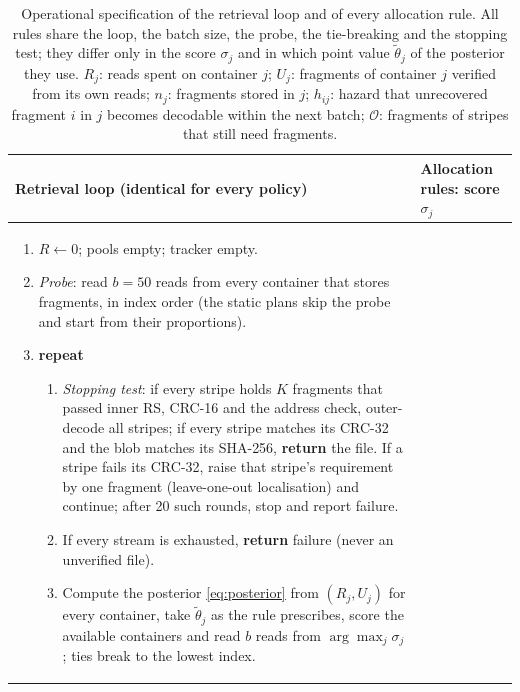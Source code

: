 \begin{table}[!t]
\centering
\caption{Operational specification of the retrieval loop and of every allocation rule.  All rules share
the loop, the batch size, the probe, the tie-breaking and the stopping test; they differ only in the
score $\sigma_j$ and in which point value $\tilde\theta_j$ of the posterior they use.  $R_j$: reads
spent on container $j$; $U_j$: fragments of container $j$ verified from its own reads; $n_j$: fragments
stored in $j$; $h_{ij}$: hazard that unrecovered fragment $i$ in $j$ becomes decodable within the next
batch; $\mathcal O$: fragments of stripes that still need fragments.}
\label{tab:algorithms}
\footnotesize
\begin{tabular}{@{}p{}p{}@{}}
\toprule
\textbf{Retrieval loop (identical for every policy)} & \textbf{Allocation rules: score $\sigma_j$} \\
\midrule
\vspace{-3mm}
\begin{enumerate}[leftmargin=4mm,itemsep=0pt,topsep=1pt]
\item $R\leftarrow0$; pools empty; tracker empty.
\item \emph{Probe}: read $b{=}50$ reads from every container that stores fragments, in index order
(the static plans skip the probe and start from their proportions).
\item \textbf{repeat}
  \begin{enumerate}[leftmargin=3mm,itemsep=0pt,topsep=0pt]
  \item \emph{Stopping test}: if every stripe holds $K$ fragments that passed inner RS, CRC-16 and the
  address check, outer-decode all stripes; if every stripe matches its CRC-32 and the blob matches its
  SHA-256, \textbf{return} the file.  If a stripe fails its CRC-32, raise that stripe's requirement by
  one fragment (leave-one-out localisation) and continue; after 20 such rounds, stop and report failure.
  \item If every stream is exhausted, \textbf{return} failure (never an unverified file).
  \item Compute the posterior \eqref{eq:posterior} from $(R_j,U_j)$ for every container, take
  $\tilde\theta_j$ as the rule prescribes, score the available containers and read $b$ reads from
  $\arg\max_j\sigma_j$; ties break to the lowest index.

\end{enumerate}
\end{enumerate}
\end{tabular}
\end{table}
